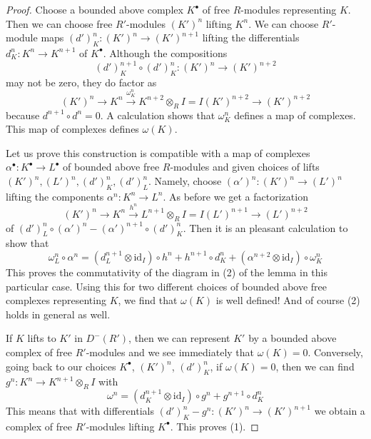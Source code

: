 \documentclass{stacks-project}
\theoremstyle{plain}
\theoremstyle{definition}
\theoremstyle{remark}
\numberwithin{equation}{subsection}
\begin{document}
\begin{proof}
Choose a bounded above complex $K^\bullet$ of free $R$-modules representing
$K$. Then we can choose free $R'$-modules $(K')^n$ lifting $K^n$.
We can choose $R'$-module maps $(d')^n_K : (K')^n \to (K')^{n + 1}$
lifting the differentials $d^n_K : K^n \to K^{n + 1}$ of $K^\bullet$.
Although the compositions
$$
(d')^{n + 1}_K \circ (d')^n_K : (K')^n \to (K')^{n + 2}
$$
may not be zero, they do factor as
$$
(K')^n \to K^n \xrightarrow{\omega^n_K}
K^{n + 2} \otimes_R I = I(K')^{n + 2} \to (K')^{n + 2}
$$
because $d^{n + 1} \circ d^n = 0$.
A calculation shows that $\omega^n_K$ defines a map of complexes.
This map of complexes defines $\omega(K)$.

\medskip\noindent
Let us prove this construction is compatible with a map of complexes
$\alpha^\bullet : K^\bullet \to L^\bullet$ of bounded above free $R$-modules
and given choices of lifts $(K')^n, (L')^n, (d')^n_K, (d')^n_L$.
Namely, choose $(\alpha')^n : (K')^n \to (L')^n$ lifting the
components $\alpha^n : K^n \to L^n$. As before we get a
factorization
$$
(K')^n \to K^n \xrightarrow{h^n}
L^{n + 1} \otimes_R I = I(L')^{n + 1} \to (L')^{n + 2}
$$
of $(d')^n_L \circ (\alpha')^n - (\alpha')^{n + 1} \circ (d')_K^n$.
Then it is an pleasant calculation to show that
$$
\omega^n_L \circ \alpha^n =
(d_L^{n + 1} \otimes \text{id}_I) \circ h^n + h^{n + 1} \circ d_K^n +
(\alpha^{n + 2} \otimes \text{id}_I) \circ \omega^n_K
$$
This proves the commutativity of the diagram in (2) of the lemma
in this particular case. Using this for two different choices
of bounded above free complexes representing $K$, we find that
$\omega(K)$ is well defined! And of course (2) holds in general as well.

\medskip\noindent
If $K$ lifts to $K'$ in $D^-(R')$, then we can represent
$K'$ by a bounded above complex of free $R'$-modules
and we see immediately that $\omega(K) = 0$.
Conversely, going back to our choices $K^\bullet$,
$(K')^n$, $(d')^n_K$, if $\omega(K) = 0$, then we can find
$g^n : K^n \to K^{n + 1} \otimes_R I$ with
$$
\omega^n = (d_K^{n + 1} \otimes \text{id}_I) \circ g^n +
g^{n + 1} \circ d_K^n
$$
This means that with differentials
$(d')^n_K - g^n : (K')^n \to (K')^{n + 1}$
we obtain a complex of free $R'$-modules lifting $K^\bullet$.
This proves (1).


\end{proof}
\end{document}
